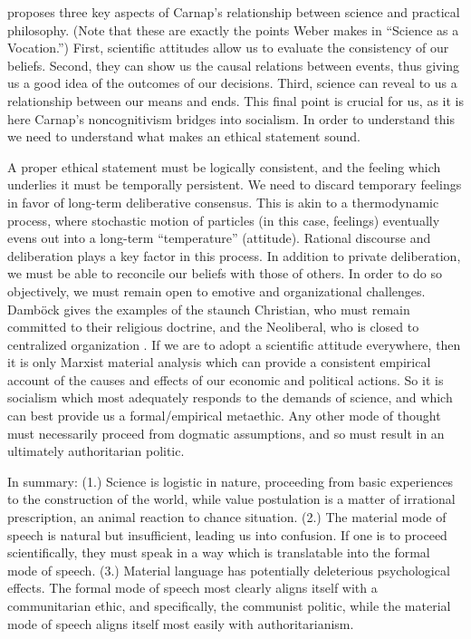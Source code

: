 \documentclass[leqno, 12pt]{turabian-researchpaper}
\begin{document}
	\autocite{dambock2022a} proposes three key aspects of Carnap's relationship between
	science and practical philosophy. (Note that these are exactly the points Weber
	makes in \enquote{Science as a Vocation.}) First, scientific attitudes allow
	us to evaluate the consistency of our beliefs. Second, they can show us the
	causal relations between events, thus giving us a good idea of the outcomes of
	our decisions. Third, science can reveal to us a relationship between our means
	and ends. This final point is crucial for us, as it is here Carnap's noncognitivism
	bridges into socialism. In order to understand this we need to understand what
	makes an ethical statement sound.

	A proper ethical statement must be logically consistent, and the feeling which
	underlies it must be temporally persistent. We need to discard temporary
	feelings in favor of long-term deliberative consensus. This is akin to a thermodynamic
	process, where stochastic motion of particles (in this case, feelings) eventually
	evens out into a long-term \enquote{temperature} (attitude). Rational discourse
	and deliberation plays a key factor in this process. In addition to private
	deliberation, we must be able to reconcile our beliefs with those of others.
	In order to do so objectively, we must remain open to emotive and organizational
	challenges. Damb\"ock gives the examples of the staunch Christian, who must remain
	committed to their religious doctrine, and the Neoliberal, who is closed to centralized
	organization \autocite[p515]{dambock2022a}. If we are to adopt a scientific
	attitude everywhere, then it is only Marxist material analysis which can provide
	a consistent empirical account of the causes and effects of our economic and political
	actions. So it is socialism which most adequately responds to the demands of
	science, and which can best provide us a formal/empirical metaethic. Any other
	mode of thought must necessarily proceed from dogmatic assumptions, and so must
	result in an ultimately authoritarian politic.

	In summary: (1.) Science is logistic in nature, proceeding from basic experiences
	to the construction of the world, while value postulation is a matter of
	irrational prescription, an animal reaction to chance situation. (2.) The
	material mode of speech is natural but insufficient, leading us into confusion.
	If one is to proceed scientifically, they must speak in a way which is translatable
	into the formal mode of speech. (3.) Material language has potentially
	deleterious psychological effects. The formal mode of speech most clearly aligns
	itself with a communitarian ethic, and specifically, the communist politic,
	while the material mode of speech aligns itself most easily with
	authoritarianism.
\end{document}
